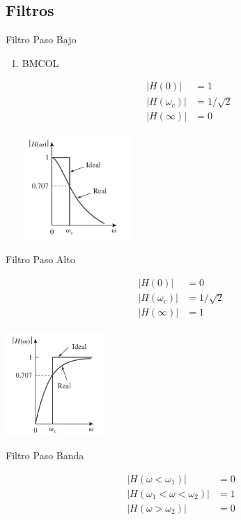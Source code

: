 \subsection{Filtros}

{Filtro Paso Bajo}
\begin{enumerate}
\item \hfill{}\textsc{BMCOL}

\begin{align*}
  |H(0)| &= 1\\
  |H(\omega_c)| &= 1/\sqrt{2}\\
  |H(\infty)| &= 0
\end{align*}

\begin{center}
\includegraphics[height=4cm]{../figs/Filtro_PasoBajo.pdf}
\end{center}
\end{enumerate}

{Filtro Paso Alto}


\begin{align*}
  |H(0)| &= 0\\
  |H(\omega_c)| &= 1/\sqrt{2}\\
  |H(\infty)| &= 1
\end{align*}


\begin{center}
\includegraphics[height=4cm]{../figs/Filtro_PasoAlto.pdf}
\end{center}

{Filtro Paso Banda}

\begin{align*}
  |H(\omega < \omega_1)| &= 0\\
  |H(\omega_1 < \omega < \omega_2)| &= 1\\
  |H(\omega > \omega_2)| &= 0
\end{align*}

